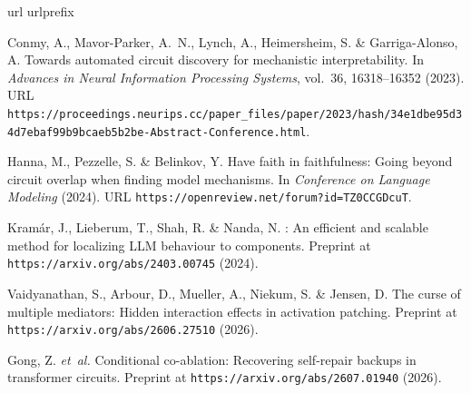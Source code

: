 \documentclass[11pt,letterpaper]{article}
\begin{document}

\begin{thebibliography}{10}
\expandafter\ifx\csname url\endcsname\relax
  \def\url#1{\texttt{#1}}\fi
\expandafter\ifx\csname urlprefix\endcsname\relax\def\urlprefix{URL }\fi
\providecommand{\bibinfo}[2]{#2}
\providecommand{\eprint}[2][]{\url{#2}}

\bibinfo{author}{Conmy, A.}, \bibinfo{author}{Mavor-Parker, A.~N.},
  \bibinfo{author}{Lynch, A.}, \bibinfo{author}{Heimersheim, S.} \&
  \bibinfo{author}{Garriga-Alonso, A.}
\newblock \bibinfo{title}{Towards automated circuit discovery for mechanistic
  interpretability}.
\newblock In \emph{\bibinfo{booktitle}{Advances in Neural Information
  Processing Systems}}, vol.~\bibinfo{volume}{36},
  \bibinfo{pages}{16318--16352} (\bibinfo{year}{2023}).
\newblock
  \urlprefix\url{https://proceedings.neurips.cc/paper_files/paper/2023/hash/34e1dbe95d34d7ebaf99b9bcaeb5b2be-Abstract-Conference.html}.

\bibinfo{author}{Hanna, M.}, \bibinfo{author}{Pezzelle, S.} \&
  \bibinfo{author}{Belinkov, Y.}
\newblock \bibinfo{title}{Have faith in faithfulness: Going beyond circuit
  overlap when finding model mechanisms}.
\newblock In \emph{\bibinfo{booktitle}{Conference on Language Modeling}}
  (\bibinfo{year}{2024}).
\newblock \urlprefix\url{https://openreview.net/forum?id=TZ0CCGDcuT}.

\bibinfo{author}{Kram{\'a}r, J.}, \bibinfo{author}{Lieberum, T.},
  \bibinfo{author}{Shah, R.} \& \bibinfo{author}{Nanda, N.}
\newblock \bibinfo{title}{{AtP*}: An efficient and scalable method for
  localizing {LLM} behaviour to components}.
\newblock \bibinfo{howpublished}{Preprint at
  \url{https://arxiv.org/abs/2403.00745}} (\bibinfo{year}{2024}).

\bibinfo{author}{Vaidyanathan, S.}, \bibinfo{author}{Arbour, D.},
  \bibinfo{author}{Mueller, A.}, \bibinfo{author}{Niekum, S.} \&
  \bibinfo{author}{Jensen, D.}
\newblock \bibinfo{title}{The curse of multiple mediators: Hidden interaction
  effects in activation patching}.
\newblock \bibinfo{howpublished}{Preprint at
  \url{https://arxiv.org/abs/2606.27510}} (\bibinfo{year}{2026}).

\bibinfo{author}{Gong, Z.} \emph{et~al.}
\newblock \bibinfo{title}{Conditional co-ablation: Recovering self-repair
  backups in transformer circuits}.
\newblock \bibinfo{howpublished}{Preprint at
  \url{https://arxiv.org/abs/2607.01940}} (\bibinfo{year}{2026}).


\end{thebibliography}
\end{document}
